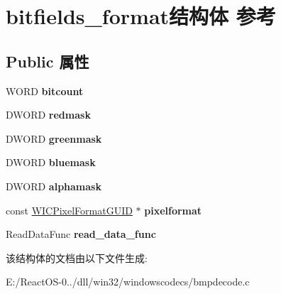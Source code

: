 \hypertarget{structbitfields__format}{}\section{bitfields\+\_\+format结构体 参考}
\label{structbitfields__format}
\subsection*{Public 属性}
\begin{DoxyCompactItemize}
\item 
\mbox{\label{structbitfields__format_a1bde93479b1517b0657201f10e1bec47}} 
W\+O\+RD {\bfseries bitcount}
\item 
\mbox{\label{structbitfields__format_af277c0cdf712e2e2e811d030d164daa4}} 
D\+W\+O\+RD {\bfseries redmask}
\item 
\mbox{\label{structbitfields__format_ad8c841de4d4175cfaf12a5219595b902}} 
D\+W\+O\+RD {\bfseries greenmask}
\item 
\mbox{\label{structbitfields__format_a6b2c5ffb2575dbd2326116ee04bf5ba9}} 
D\+W\+O\+RD {\bfseries bluemask}
\item 
\mbox{\label{structbitfields__format_aa834c0018d894c8d6cbc792c2e36ffb6}} 
D\+W\+O\+RD {\bfseries alphamask}
\item 
\mbox{\label{structbitfields__format_a23245605ae8634d07a11405b82df5d22}} 
const \hyperlink{interface_g_u_i_d}{W\+I\+C\+Pixel\+Format\+G\+U\+ID} $\ast$ {\bfseries pixelformat}
\item 
\mbox{\label{structbitfields__format_ace67dd20257a9447545b4f9a01d8bbc1}} 
Read\+Data\+Func {\bfseries read\+\_\+data\+\_\+func}
\end{DoxyCompactItemize}


该结构体的文档由以下文件生成\+:\begin{DoxyCompactItemize}
\item 
E\+:/\+React\+O\+S-\/0../dll/win32/windowscodecs/bmpdecode.\+c\end{DoxyCompactItemize}
